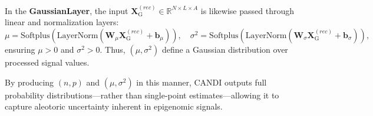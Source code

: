 \documentclass[a4paper, 11pt]{article}
\begin{document}
\begin{enumerate}
        In the \textbf{GaussianLayer}, the input \(\mathbf{X}^{(rec)}_{\text{G}} \in \mathbb{R}^{N \times L \times A}\) is likewise passed through linear and normalization layers:
        \[
        \mu = \text{Softplus}(\text{LayerNorm}(\mathbf{W}_\mu \mathbf{X}^{(rec)}_{\text{G}} + \mathbf{b}_\mu)), \quad \sigma^2 = \text{Softplus}(\text{LayerNorm}(\mathbf{W}_\sigma \mathbf{X}^{(rec)}_{\text{G}} + \mathbf{b}_\sigma)),
        \]
        ensuring $\mu>0$ and $\sigma^2>0$. Thus, $(\mu,\sigma^2)$ define a Gaussian distribution over processed signal values.
    
        By producing $(n,p)$ and $(\mu,\sigma^2)$ in this manner, CANDI outputs full probability distributions—rather than single-point estimates—allowing it to capture aleotoric uncertainty inherent in epigenomic signals.
        
\end{enumerate}

\newpage
\printbibliography
\end{document}
